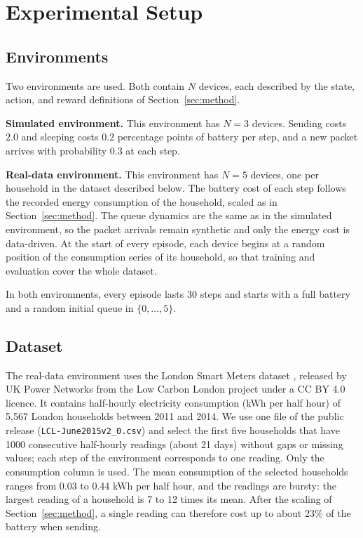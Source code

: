 \documentclass[conference]{IEEEtran}
\begin{document}
\section{Experimental Setup}
\label{sec:setup}

\subsection{Environments}
Two environments are used. Both contain $N$ devices, each described by the state, action, and reward definitions of Section~\ref{sec:method}.

\textbf{Simulated environment.} This environment has $N=3$ devices. Sending costs $2.0$ and sleeping costs $0.2$ percentage points of battery per step, and a new packet arrives with probability $0.3$ at each step.

\textbf{Real-data environment.} This environment has $N=5$ devices, one per household in the dataset described below. The battery cost of each step follows the recorded energy consumption of the household, scaled as in Section~\ref{sec:method}. The queue dynamics are the same as in the simulated environment, so the packet arrivals remain synthetic and only the energy cost is data-driven. At the start of every episode, each device begins at a random position of the consumption series of its household, so that training and evaluation cover the whole dataset.

In both environments, every episode lasts 30 steps and starts with a full battery and a random initial queue in $\{0,\dots,5\}$.

\subsection{Dataset}
The real-data environment uses the London Smart Meters dataset \cite{lcl2015}, released by UK Power Networks from the Low Carbon London project under a CC BY 4.0 licence. It contains half-hourly electricity consumption (kWh per half hour) of 5,567 London households between 2011 and 2014. We use one file of the public release (\texttt{LCL-June2015v2\_0.csv}) and select the first five households that have 1000 consecutive half-hourly readings (about 21 days) without gaps or missing values; each step of the environment corresponds to one reading. Only the consumption column is used. The mean consumption of the selected households ranges from 0.03 to 0.44 kWh per half hour, and the readings are bursty: the largest reading of a household is 7 to 12 times its mean. After the scaling of Section~\ref{sec:method}, a single reading can therefore cost up to about 23\% of the battery when sending.
\end{document}

